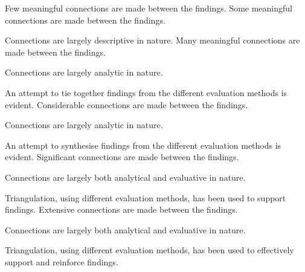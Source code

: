 \documentclass{../../../fal_assignment}
\begin{document}
\begin{markingrubric}
%
        \grade \fail	Few meaningful connections are made between the findings.
        \grade 		Some meaningful connections are made between the findings.
        \par     		Connections are largely descriptive in nature.
        \grade		Many meaningful connections are made between the findings.
        \par     		Connections are largely analytic in nature.
        \par		An attempt to tie together findings from the different evaluation methods is evident.
        \grade		Considerable connections are made between the findings.
        \par     		Connections are largely analytic in nature.
        \par		An attempt to synthesise findings from the different evaluation methods is evident.
        \grade		Significant connections are made between the findings.
        \par		Connections are largely both analytical and evaluative in nature.
        \par		Triangulation, using different evaluation methods, has been used to support findings.
        \grade		Extensive connections are made between the findings.
        \par		Connections are largely both analytical and evaluative in nature.
        \par		Triangulation, using different evaluation methods, has been used to effectively support and reinforce findings.


\end{markingrubric}
\end{document}
